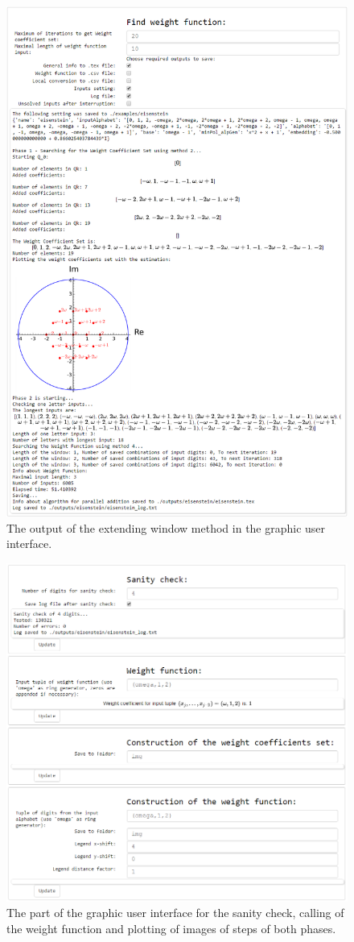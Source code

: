 \begin{figure}[htbp]
  \centering
  \includegraphics[width=\textwidth]{img/interact2.png}
  \caption{The output of the extending window method in the graphic user interface.}
  \label{fig:interact2}
\end{figure}

\begin{figure}[htbp]
  \centering
  \includegraphics[width=\textwidth]{img/interact3.png}
  \caption{The part of the graphic user interface for the sanity check, calling of the weight function and plotting of images of steps of both phases.}
  \label{fig:interact3}
\end{figure}